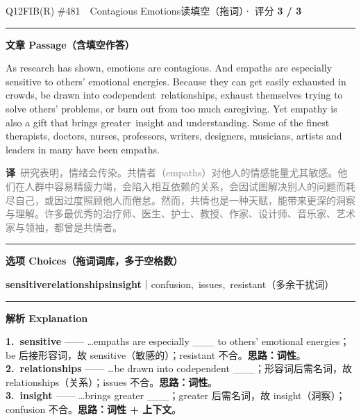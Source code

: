 \documentclass[11pt]{article}
\newcommand{\ptesub}[1]{%
  \par\needspace{2\baselineskip}\smallskip
  {\color{cAccent}\rule[-0.2ex]{3pt}{1.05em}}\hspace{6pt}%
  {\bfseries\color{cHead}#1}\par\nopagebreak\smallskip}
\newcommand{\zh}[1]{{\footnotesize\textcolor{cNote}{\textbf{译}}\ \textcolor{gray}{#1}}}
\newcommand{\rok}[1]{{\color{cFix}\ding{51}\,#1}}                 %
\begin{document}
\begin{qblock}{Q12\quad FIB(R) \#481\ \ Contagious Emotions}{读填空（拖词）· 评分 \textcolor{cAccent}{\bfseries 3 / 3}}
\ptesub{文章 Passage（含填空作答）}
\begin{promptbox}
As research has shown, emotions are contagious. And empaths are especially \rok{sensitive} to others' emotional energies. Because they can get easily exhausted in crowds, be drawn into codependent \rok{relationships}, exhaust themselves trying to solve others' problems, or burn out from too much caregiving. Yet empathy is also a gift that brings greater \rok{insight} and understanding. Some of the finest therapists, doctors, nurses, professors, writers, designers, musicians, artists and leaders in many have been empaths.
\end{promptbox}
\zh{研究表明，情绪会传染。共情者（empaths）对他人的情感能量尤其敏感。他们在人群中容易精疲力竭，会陷入相互依赖的关系，会因试图解决别人的问题而耗尽自己，或因过度照顾他人而倦怠。然而，共情也是一种天赋，能带来更深的洞察与理解。许多最优秀的治疗师、医生、护士、教授、作家、设计师、音乐家、艺术家与领袖，都曾是共情者。}
\ptesub{选项 Choices（拖词词库，多于空格数）}
{\small \textbf{sensitive}\quad \textbf{relationships}\quad \textbf{insight}\quad ｜\quad confusion,\ issues,\ resistant（多余干扰词）}
\ptesub{解析 Explanation}
\begin{notebox}\footnotesize
\textbf{1.\ sensitive} —— …empaths are especially \_\_\_ to others' emotional energies；be 后接形容词，故 sensitive（敏感的）；resistant 不合。\textbf{思路：词性}。\\[2pt]
\textbf{2.\ relationships} —— …be drawn into codependent \_\_\_；形容词后需名词，故 relationships（关系）；issues 不合。\textbf{思路：词性}。\\[2pt]
\textbf{3.\ insight} —— …brings greater \_\_\_；greater 后需名词，故 insight（洞察）；confusion 不合。\textbf{思路：词性 + 上下文}。
\end{notebox}
\end{qblock}
\end{document}
